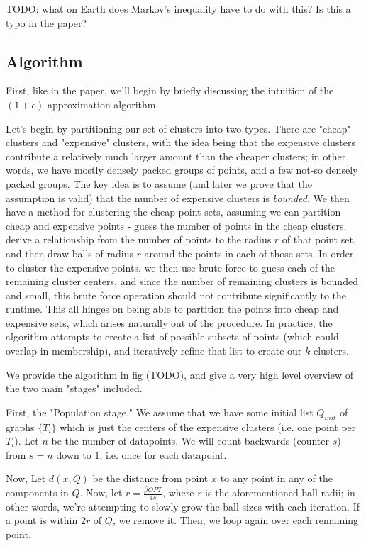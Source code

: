 \documentclass[paper=a4, fontsize=11pt]{scrartcl} %
\numberwithin{equation}{section} %
\numberwithin{figure}{section} %
\numberwithin{table}{section} %
\begin{document}
TODO: what on Earth does Markov's inequality have to do with this?  Is this a typo in the paper?

\subsection{Algorithm}
First, like in the paper, we'll begin by briefly discussing the intuition of the $(1 + \epsilon)$ approximation algorithm.

Let's begin by partitioning our set of clusters into two types.  There are  "cheap" clusters and "expensive" clusters, with the idea being that the expensive clusters contribute a relatively much larger amount than the cheaper clusters; in other words, we have mostly densely packed groups of points, and a few not-so densely packed groups.  The key idea is to assume (and later we prove that the assumption is valid) that the number of expensive clusters is \emph{bounded}.  We then have a method for clustering the cheap point sets, assuming we can partition cheap and expensive points - guess the number of points in the cheap clusters, derive a relationship from the number of points to the radius $r$ of that point set, and then draw balls of radius $r$ around the points in each of those sets.  In order to cluster the expensive points, we then use brute force to guess each of the remaining cluster centers, and since the number of remaining clusters is bounded and small, this brute force operation should not contribute significantly to the runtime.  This all hinges on being able to partition the points into cheap and expensive sets, which arises naturally out of the procedure.  In practice, the algorithm attempts to create a list of possible subsets of points (which could overlap in membership), and iteratively refine that list to create our $k$ clusters. 



We provide the algorithm in fig (TODO), and give a very high level overview of the two main "stages" included.

First, the "Population stage."  We assume that we have some initial list $Q_{init}$ of graphs $\{T_i\}$ which is just the centers of the expensive clusters (i.e. one point per $T_i$).  Let $n$ be the number of datapoints.  We will count backwards (counter $s$) from $s=n$ down to $1$, i.e. once for each datapoint.

Now, Let $d(x, Q)$ be the distance from point $x$ to any point in any of the components in $Q$.  Now, let $r = \frac{\beta OPT}{4 s}$, where $r$ is the aforementioned ball radii; in other words, we're attempting to slowly grow the ball sizes with each iteration.  If a point is within $2r$ of $Q$, we remove it. Then, we loop again over each remaining point.
\end{document}
